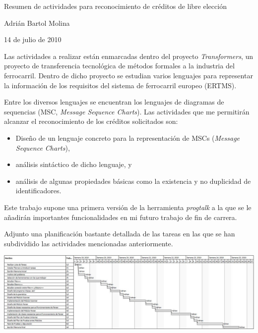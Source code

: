 \documentclass{article}
\begin{document}
\mbox{}
\vspace{5cm}

\begin{center}
  \LARGE
  Resumen de actividades para reconocimiento de créditos de libre elección
\end{center}

\begin{center}
  \Large
  Adrián Bartol Molina
\end{center}

\begin{center}
  \large
  14 de julio de 2010
\end{center}


Las actividades a realizar están enmarcadas dentro del proyecto
\emph{Transformers}, un proyecto de transferencia tecnológica de
métodos formales a la industria del ferrocarril. Dentro de dicho
proyecto se estudian varios lenguajes para representar la información
de los requisitos del sistema de ferrocarril europeo (ERTMS).

Entre los diversos lenguajes se encuentran los lenguajes de diagramas
de sequencias (MSC, \emph{Message Sequence Charts}). Las actividades
que me permitirán alcanzar el reconocimiento de los créditos
solicitados son:
\begin{itemize}
\item Diseño de un lenguaje concreto para la representación de MSCs (\emph{Message Sequence Charts}),
\item análisis sintáctico de dicho lenguaje, y
\item análisis de algunas propiedades básicas como la existencia y no duplicidad de identificadores.
\end{itemize}

Este trabajo supone una primera versión de la herramienta
\emph{progtalk} a la que se le añadirán importantes funcionalidades en
mi futuro trabajo de fin de carrera.

Adjunto una planificación bastante detallada de las tareas en las
que se han subdividido las actividades mencionadas anteriormente.

\newpage
\includegraphics[angle=90,scale=0.7]{planner}
\end{document}
